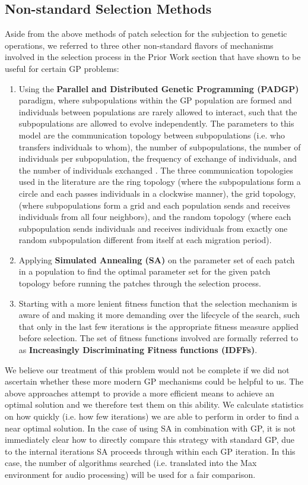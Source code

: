 \documentclass[a4paper,12pt]{report} 	%
\numberwithin{figure}{chapter}
\numberwithin{table}{chapter}
\numberwithin{equation}{chapter}
\begin{document}
\begin{flushleft}
\subsection{Non-standard Selection Methods}

Aside from the above methods of patch selection for the subjection to genetic operations, we referred to three other non-standard flavors of mechanisms involved in the selection process in the Prior Work section that have shown to be useful for certain GP problems:

\begin{enumerate}
\item Using the \textbf{Parallel and Distributed Genetic Programming (PADGP)} paradigm, where subpopulations within the GP population are formed and individuals between populations are rarely allowed to interact, such that the subpopulations are allowed to evolve independently. The parameters to this model are the communication topology between subpopulations (i.e. who transfers individuals to whom), the number of subpopulations, the number of individuals per subpopulation, the frequency of exchange of individuals, and the number of individuals exchanged \cite[p. 178]{Vanneschi:2004le}. The three communication topologies used in the literature are the ring topology (where the subpopulations form a circle and each passes individuals in a clockwise manner), the grid topology, (where subpopulations form a grid and each population sends and receives individuals from all four neighbors), and the random topology (where each subpopulation sends individuals and receives individuals from exactly one random subpopulation different from itself at each migration period).
\item Applying \textbf{Simulated Annealing (SA)} on the parameter set of each patch in a population to find the optimal parameter set for the given patch topology before running the patches through the selection process.  
\item Starting with a more lenient fitness function that the selection mechanism is aware of and making it more demanding over the lifecycle of the search, such that only in the last few iterations is the appropriate fitness measure applied before selection. The set of fitness functions involved are formally referred to as \textbf{Increasingly Discriminating Fitness functions (IDFFs)}. 
\end{enumerate}

We believe our treatment of this problem would not be complete if we did not ascertain whether these more modern GP mechanisms could be helpful to us. The above approaches attempt to provide a more efficient means to achieve an optimal solution and we therefore test them on this ability. We calculate statistics on how quickly (i.e. how few iterations) we are able to perform in order to find a near optimal solution. In the case of using SA in combination with GP, it is not immediately clear how to directly compare this strategy with standard GP, due to the internal iterations SA proceeds through within each GP iteration. In this case, the number of algorithms searched (i.e. translated into the Max environment for audio processing) will be used for a fair comparison.


\end{flushleft}
\end{document}
